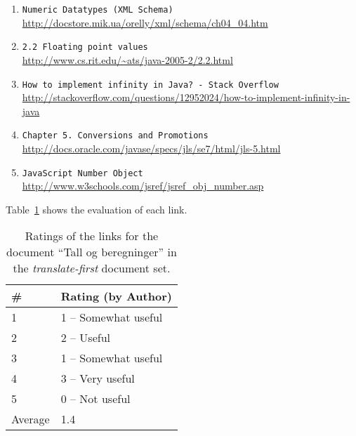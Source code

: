 \begin{enumerate}
\item
    \verb|Numeric Datatypes (XML Schema)| \\
    \url{http://docstore.mik.ua/orelly/xml/schema/ch04_04.htm}
\item
    \verb|2.2 Floating point values| \\
    \url{http://www.cs.rit.edu/~ats/java-2005-2/2.2.html}
\item
    \verb|How to implement infinity in Java? - Stack Overflow| \\
    \url{http://stackoverflow.com/questions/12952024/how-to-implement-infinity-in-java}
\item
    \verb|Chapter 5. Conversions and Promotions| \\
    \url{http://docs.oracle.com/javase/specs/jls/se7/html/jls-5.html}
\item
    \verb|JavaScript Number Object| \\
    \url{http://www.w3schools.com/jsref/jsref_obj_number.asp}
\end{enumerate}

Table~\ref{tab:ratings-en-tall-og-beregninger} shows the evaluation of each link.
\begin{table}[H]
\centering
\begin{tabular}{|l|l|}
\hline\hline
    \# & Rating (by Author) \\
\hline
    1 & 1 -- Somewhat useful \\
    2 & 2 -- Useful \\
    3 & 1 -- Somewhat useful \\
    4 & 3 -- Very useful \\
    5 & 0 -- Not useful \\
\hline
    Average & 1.4 \\
\hline\hline
\end{tabular}
\caption{Ratings of the links for the document ``Tall og beregninger'' in the \textit{translate-first} document set.}
\label{tab:ratings-en-tall-og-beregninger}
\end{table}